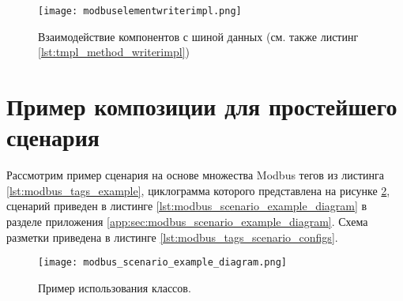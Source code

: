\begin{center}
    \begin{figure}
        \texttt{[image: modbuselementwriterimpl.png]}
        \caption{Взаимодействие компонентов с шиной данных (см. также листинг \ref{lst:tmpl_method_writerimpl})}\label{fig:modbuselementwriterimpl}
    \end{figure}
\end{center}


\clearpage
\section{Пример композиции для простейшего сценария}

Рассмотрим пример сценария на основе множества Modbus тегов из листинга \ref{lst:modbus_tags_example},
циклограмма которого представлена на рисунке \ref{fig:modbus_scenario_example_diagram},
сценарий приведен в листинге \ref{lst:modbus_scenario_example_diagram} в разделе приложения \ref{app:sec:modbus_scenario_example_diagram}.
Схема разметки приведена в листинге \ref{lst:modbus_tags_scenario_configs}.

\begin{landscape}
    \begin{center}
        \begin{figure}
            \texttt{[image: modbus\_scenario\_example\_diagram.png]}
            \caption{Пример использования классов.}\label{fig:modbus_scenario_example_diagram}
        \end{figure}
    \end{center}
\end{landscape}
